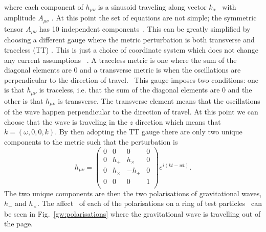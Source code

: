 where each component of $h_{\mu \nu}$ is a sinusoid traveling along vector
$k_{\alpha}$~ with amplitude $A_{\mu\nu}$
\citep{capano2011SearchingGravitational}.  At this point the set of equations
are not simple; the symmetric tensor $A_{\mu \nu}$ has 10 independent
components~. This can be greatly
simplified by choosing a different gauge where the metric perturbation is both
transverse and traceless (TT) \citep{flanagan2005BasicsGravitational}.  This is
just a choice of coordinate system which does not change any current
assumptions ~. A traceless metric is one where the sum of the diagonal
elements are 0 and a transverse metric is when the oscillations are
perpendicular to the direction of travel.~  This gauge imposes two conditions: one
is that $h_{\mu \nu}$ is traceless, i.e. that the sum of the diagonal elements
are 0 and the other is that $h_{\mu \nu}$ is transverse.  The transverse
element means that the oscillations of the wave happen perpendicular to the
direction of travel.  At this point we can choose that the wave is traveling in
the $z$ direction which means that $k = (\omega,0,0,k)$.  By then adopting the
TT gauge there are only two unique components to the metric such that the
perturbation is
\begin{equation}
\label{intro:gw:gravwave}
h_{\mu \nu} = \left( 
\begin{matrix}
0 & 0 & 0 & 0 \\
0 & h_{+} & h_{\times} & 0 \\
0 & h_{\times} & -h_{+} & 0 \\
0 & 0 & 0 & 1 \\
\end{matrix}
\right) 
e^{i(kt - wt)}.
\end{equation}
The two unique components are then the two polarisations of gravitational
waves, $h_{+}$ and $h_{\times}$.  The affect~ of each of the polarisations on a
ring of test particles~ can be seen in Fig.~\ref{gw:polarisations} where the
gravitational wave is travelling out of the page.~


